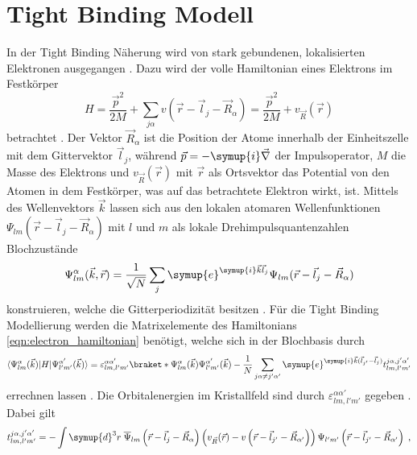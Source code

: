 \section{Tight Binding Modell}
\label{sec:tightbinding}
In der Tight Binding Näherung wird von stark gebundenen, lokalisierten Elektronen ausgegangen \cite{Czycholl}.
Dazu wird der volle Hamiltonian eines Elektrons im Festkörper
\begin{equation}
    H = \frac{\vec{p}^2}{2M} + \sum_{j\alpha} v(\vec{r}-\vec{l}_j - \vec{R}_{\alpha}) = \frac{\vec{p}^2}{2M} + v_{\vec{R}}(\vec{r})\label{eqn:electron_hamiltonian}
\end{equation}
betrachtet \cite{Czycholl}.
Der Vektor $\vec{R}_{\alpha}$ ist die Position der Atome innerhalb der Einheitszelle mit dem Gittervektor $\vec{l}_j$, während
$\vec{p} = -\symup{i}\vec{\nabla}$ der Impulsoperator, $M$ die Masse des Elektrons und $v_{\vec{R}}(\vec{r})$ mit $\vec{r}$ als Ortsvektor das Potential von den Atomen in dem Festkörper, 
was auf das betrachtete Elektron wirkt, ist.
Mittels des Wellenvektors $\vec{k}$ lassen sich aus den lokalen atomaren Wellenfunktionen $\Psi_{lm} \left (\vec{r}-\vec{l}_j - \vec{R}_{\alpha} \right )$ mit $l$ und $m$ als lokale Drehimpulsquantenzahlen
Blochzustände
\begin{equation}
    \Psi^{\alpha}_{lm}(\vec{k}, \vec{r}) = \frac{1}{\sqrt{N}} \sum_{j} \symup{e}^{\symup{i}\vec{k}\vec{l}_j} \Psi_{lm}(\vec{r}-\vec{l}_j - \vec{R}_{\alpha}) 
\end{equation}
konstruieren, welche die Gitterperiodizität besitzen \cite{SC_literature}.
Für die Tight Binding Modellierung werden die Matrixelemente des Hamiltonians \eqref{eqn:electron_hamiltonian}
benötigt, welche sich in der Blochbasis durch
\begin{equation*}
    \bra{\Psi^{\alpha}_{lm}(\vec{k})} H \ket{\Psi^{\alpha'}_{l'm'}(\vec{k})} = \varepsilon_{lm,l'm'}^{\alpha \alpha'} \braket*{\Psi^{\alpha}_{lm}(\vec{k})}{\Psi^{\alpha'}_{l'm'}(\vec{k})}
    - \frac{1}{N} \sum_{j\alpha \neq j' \alpha'} \symup{e}^{\symup{i}\vec{k}(\vec{l}_{j'}-\vec{l}_{j})}  t^{j\alpha,j'\alpha'}_{lm,l'm'}
\end{equation*}
errechnen lassen \cite{Czycholl, SC_literature}.
Die Orbitalenergien im Kristallfeld sind durch $\varepsilon_{lm,l'm'}^{\alpha \alpha'}$ gegeben \cite{SC_literature}.
Dabei gilt
\begin{equation*}
    t^{j\alpha,j'\alpha'}_{lm,l'm'} = - \int \symup{d}^3r \; \overline{\Psi}_{lm} \left (\vec{r}-\vec{l}_j - \vec{R}_{\alpha} \right ) 
    \left ( v_{\vec{R}} (\vec{r}) - v \left (\vec{r} - \vec{l}_{j'} - \vec{R}_{\alpha'} \right )   \right ) \Psi_{l'm'} \left (\vec{r}-\vec{l}_{j'} - \vec{R}_{\alpha'} \right )  \; ,
\end{equation*}
